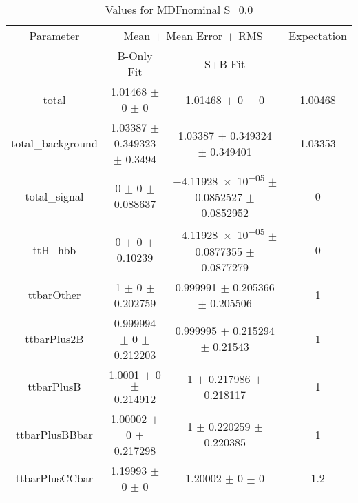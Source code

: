 \begin{table}
\centering
\caption{Values for MDFnominal S=0.0}
\begin{tabular}{cccc}
\toprule
Parameter & \multicolumn{2}{c}{Mean $\pm$ Mean Error $\pm$ RMS} & Expectation\\
 & B-Only Fit & S+B Fit & \\
\midrule
total & \num{1.01468} $\pm$ \num{0} $\pm$ \num{0} & \num{1.01468} $\pm$ \num{0} $\pm$ \num{0} & \num{1.00468}\\
total\_background & \num{1.03387} $\pm$ \num{0.349323} $\pm$ \num{0.3494} & \num{1.03387} $\pm$ \num{0.349324} $\pm$ \num{0.349401} & \num{1.03353}\\
total\_signal & \num{0} $\pm$ \num{0} $\pm$ \num{0.088637} & \num{-4.11928e-05} $\pm$ \num{0.0852527} $\pm$ \num{0.0852952} & \num{0}\\
ttH\_hbb & \num{0} $\pm$ \num{0} $\pm$ \num{0.10239} & \num{-4.11928e-05} $\pm$ \num{0.0877355} $\pm$ \num{0.0877279} & \num{0}\\
ttbarOther & \num{1} $\pm$ \num{0} $\pm$ \num{0.202759} & \num{0.999991} $\pm$ \num{0.205366} $\pm$ \num{0.205506} & \num{1}\\
ttbarPlus2B & \num{0.999994} $\pm$ \num{0} $\pm$ \num{0.212203} & \num{0.999995} $\pm$ \num{0.215294} $\pm$ \num{0.21543} & \num{1}\\
ttbarPlusB & \num{1.0001} $\pm$ \num{0} $\pm$ \num{0.214912} & \num{1} $\pm$ \num{0.217986} $\pm$ \num{0.218117} & \num{1}\\
ttbarPlusBBbar & \num{1.00002} $\pm$ \num{0} $\pm$ \num{0.217298} & \num{1} $\pm$ \num{0.220259} $\pm$ \num{0.220385} & \num{1}\\
ttbarPlusCCbar & \num{1.19993} $\pm$ \num{0} $\pm$ \num{0} & \num{1.20002} $\pm$ \num{0} $\pm$ \num{0} & \num{1.2}\\
\bottomrule
\end{tabular}
\end{table}